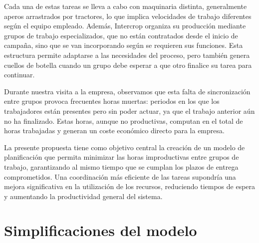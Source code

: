 Cada una de estas tareas se lleva a cabo con maquinaria distinta, generalmente aperos arrastrados por tractores, lo que implica velocidades de trabajo diferentes según el equipo empleado.
Además, Intercrop organiza su producción mediante grupos de trabajo especializados, que no están contratados desde el inicio de campaña, sino que se van incorporando según se requieren sus funciones.
Esta estructura permite adaptarse a las necesidades del proceso, pero también genera cuellos de botella cuando un grupo debe esperar a que otro finalice su tarea para continuar.

Durante nuestra visita a la empresa, observamos que esta falta de sincronización entre grupos provoca frecuentes horas muertas: periodos en los que los trabajadores están presentes pero sin poder actuar,
ya que el trabajo anterior aún no ha finalizado. Estas horas, aunque no productivas, computan en el total de horas trabajadas y generan un coste económico directo para la empresa.

La presente propuesta tiene como objetivo central la creación de un modelo de planificación que permita minimizar las horas improductivas entre grupos de trabajo,
garantizando al mismo tiempo que se cumplan los plazos de entrega comprometidos. Una coordinación más eficiente de las tareas supondría una mejora significativa en la utilización de los recursos,
reduciendo tiempos de espera y aumentando la productividad general del sistema.

\section*{Simplificaciones del modelo}

